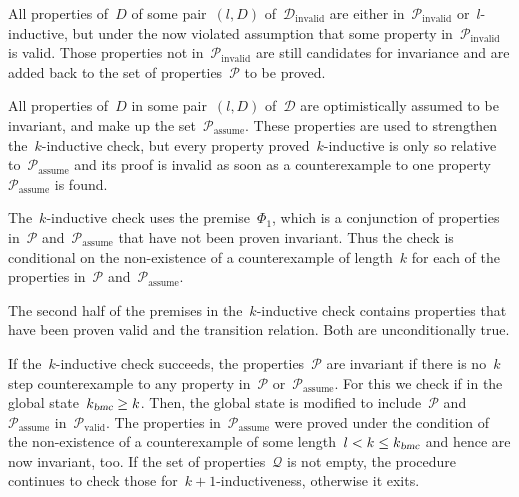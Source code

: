 \documentclass[12pt]{article}
\renewcommand{\textproc}{\textsl}
\begin{document}
All properties of~$D$ of some pair~$(l,D)$ of~$\mathcal{D}_\mathrm{invalid}$ are either in~$\mathcal{P}_\mathrm{invalid}$ or~$l$\nobreakdash-inductive, but under the now violated assumption that some property in~$\mathcal{P}_\mathrm{invalid}$ is valid. Those properties not in~$\mathcal{P}_\mathrm{invalid}$ are still candidates for invariance and are added back to the set of properties~$\mathcal{P}$ to be proved.

All properties of~$D$ in some pair~$(l,D)$ of~$\mathcal{D}$ are optimistically assumed to be invariant, and make up the set~$\mathcal{P}_\mathrm{assume}$. These properties are used to strengthen the~$k$\nobreakdash-inductive check, but every property proved~$k$\nobreakdash-inductive is only so relative to~$\mathcal{P}_\mathrm{assume}$ and its proof is invalid as soon as a counterexample to one property~$\mathcal{P}_\mathrm{assume}$ is found.

The~$k$\nobreakdash-inductive check uses the premise~$\Phi_1$, which is a conjunction of properties in~$\mathcal{P}$ and~$\mathcal{P}_\mathrm{assume}$ that have not been proven invariant. Thus the check is conditional on the non-existence of a counterexample of length~$k$ for each of the properties in~$\mathcal{P}$ and~$\mathcal{P}_\mathrm{assume}$.

The second half of the premises in the~$k$\nobreakdash-inductive check contains properties that have been proven valid and the transition relation. Both are unconditionally true.

If the~$k$\nobreakdash-inductive check succeeds, the properties~$\mathcal{P}$ are invariant if there is no~$k$ step counterexample to any property in~$\mathcal{P}$ or~$\mathcal{P}_\mathrm{assume}$. For this we check if in the global state~${k_\textproc{bmc}\geq k}$. Then, the global state is modified to include~$\mathcal{P}$ and~$\mathcal{P}_\mathrm{assume}$ in~$\mathcal{P}_\mathrm{valid}$. The properties in~$\mathcal{P}_\mathrm{assume}$ were proved under the condition of the non-existence of a counterexample of some length~${l < k \leq k_\textproc{bmc}}$ and hence are now invariant, too. If the set of properties~$\mathcal{Q}$ is not empty, the procedure continues to check those for~${k+1}$\nobreakdash-in\-duct\-ive\-ness, otherwise it exits.
\end{document}
